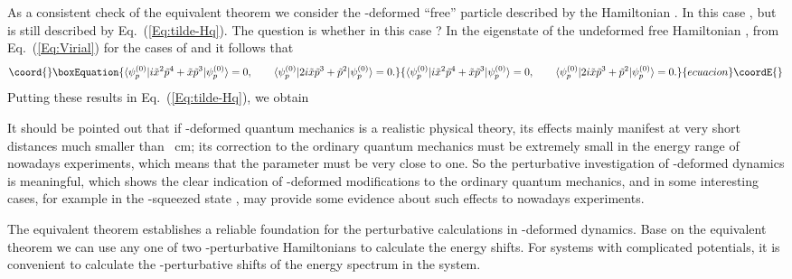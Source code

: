 \documentclass[a4paper,12pt]{article}
\begin{document}
As a consistent check of the  equivalent theorem we consider the  
\coordHE{}-deformed ``free'' particle described by the Hamiltonian 
\coordHE{}.
In this case \coordHE{}, but 
\coordHE{} is still described by 
Eq.~(\ref{Eq:tilde-Hq}). The question is whether in this case
 \coordHE{} ? In the eigenstate \coordHE{}
of the undeformed free Hamiltonian
 \coordHE{}, from
Eq.~(\ref{Eq:Virial}) for the cases of \coordHE{} and \coordHE{}  it follows that
\begin{equation}\coord{}\boxEquation{
\langle \psi_p^{(0)}|i\tilde x^2\tilde p^4
+ \tilde x\tilde p^3 |\psi_p^{(0)}\rangle =0, \qquad
\langle \psi_p^{(0)}|2i\tilde x\tilde p^3
+ \tilde p^2 |\psi_p^{(0)}\rangle =0. \nonumber
}{
\langle \psi_p^{(0)}|i\tilde x^2\tilde p^4
+ \tilde x\tilde p^3 |\psi_p^{(0)}\rangle =0, \qquad
\langle \psi_p^{(0)}|2i\tilde x\tilde p^3
+ \tilde p^2 |\psi_p^{(0)}\rangle =0. \nonumber
}{ecuacion}\coordE{}\end{equation}
Putting these results in Eq.~(\ref{Eq:tilde-Hq}), we obtain 
 \coordHE{}

It should be pointed out that if \coordHE{}-deformed quantum mechanics is
 a realistic physical theory, its effects mainly manifest at very short
 distances much smaller than \coordHE{}~cm; 
its correction to the ordinary quantum mechanics must be extremely small
 in the energy range of nowadays experiments, 
which means that the parameter \coordHE{} must be very close to one.
So the perturbative investigation of  \coordHE{}-deformed dynamics is meaningful,
 which shows the  clear indication of \coordHE{}-deformed modifications 
to the ordinary quantum mechanics, and in some interesting cases, for example 
in the \coordHE{}-squeezed state \cite{OZ00},  may provide some evidence about 
such effects to nowadays experiments.

The equivalent theorem establishes  a reliable foundation for  the
 perturbative calculations in  \coordHE{}-deformed dynamics.
  Base on the equivalent theorem we can use any one of  two \coordHE{}-perturbative 
Hamiltonians to calculate the energy  shifts. For systems  with 
complicated potentials, it is convenient to calculate 
the \coordHE{}-perturbative shifts of the energy spectrum in  the 
\coordHE{} system.
\end{document}
